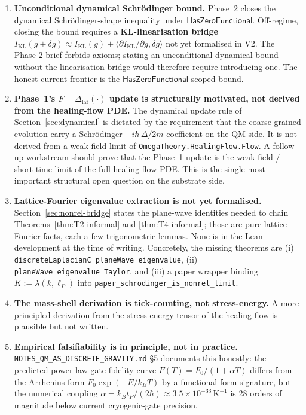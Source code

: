 \documentclass[11pt,a4paper,twoside]{article}
\theoremstyle{definition}
\newcommand{\KL}{I_{\mathrm{KL}}}
\newcommand{\lP}{\ell_P}
\newcommand{\tP}{t_P}
\newcommand{\kB}{k_B}
\newcommand{\HasZF}{\mathsf{HasZeroFunctional}}
\newcommand{\code}[1]{\texttt{#1}}
\begin{document}
\begin{enumerate}
\item \textbf{Unconditional dynamical Schr\"odinger bound.} Phase~2
  closes the dynamical Schr\"odinger-shape inequality under $\HasZF$.
  Off-regime, closing the bound requires a \textbf{KL-linearisation
  bridge}
  $\KL(g+\delta g)\approx\KL(g)+\langle\partial\KL/\partial g,\delta g\rangle$
  not yet formalised in V2. The Phase-2 brief forbids axioms; stating
  an unconditional dynamical bound without the linearisation bridge
  would therefore require introducing one. The honest current
  frontier is the $\HasZF$-scoped bound.

\item \textbf{Phase~1's $F=\Delta_{\mathrm{lat}}(\cdot)$ update is
  structurally motivated, not derived from the healing-flow PDE.}
  The dynamical update rule of Section~\ref{sec:dynamical} is
  dictated by the requirement that the coarse-grained evolution
  carry a Schr\"odinger $-i\hbar\,\Delta/2m$ coefficient on the QM
  side. It is not derived from a weak-field limit of
  \code{OmegaTheory.HealingFlow.Flow}. A follow-up workstream should
  prove that the Phase~1 update is the weak-field / short-time limit
  of the full healing-flow PDE. This is the single most important
  structural open question on the substrate side.

\item \textbf{Lattice-Fourier eigenvalue extraction is not yet
  formalised.} Section~\ref{sec:nonrel-bridge} states the plane-wave
  identities needed to chain Theorems~\ref{thm:T2-informal} and
  \ref{thm:T4-informal}; those are pure lattice-Fourier facts, each a
  few trigonometric lemmas. None is in the Lean development at the
  time of writing. Concretely, the missing theorems are
  (i) \code{discreteLaplacianC\_planeWave\_eigenvalue},
  (ii) \code{planeWave\_eigenvalue\_Taylor}, and
  (iii) a paper wrapper binding $K:=\lambda(k,\lP)$ into
  \code{paper\_schrodinger\_is\_nonrel\_limit}.

\item \textbf{The mass-shell derivation is tick-counting, not
  stress-energy.} A more principled derivation from the stress-energy
  tensor of the healing flow is plausible but not written.

\item \textbf{Empirical falsifiability is in principle, not in
  practice.} \code{NOTES\_QM\_AS\_DISCRETE\_GRAVITY.md} §5
  \cite{NotesQMasDiscreteGravity} documents this honestly: the
  predicted power-law gate-fidelity curve $F(T)=F_{0}/(1+\alpha T)$
  differs from the Arrhenius form $F_{0}\exp(-E/\kB T)$ by a
  functional-form signature, but the numerical coupling
  $\alpha=\kB\tP/(2\hbar)\approx 3.5\times 10^{-33}\,\mathrm{K}^{-1}$
  is 28 orders of magnitude below current cryogenic-gate precision.


\end{enumerate}
\end{document}
